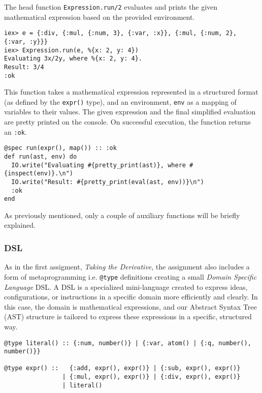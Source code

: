 \documentclass[a4paper,11pt]{article}
\begin{document}
The head function
\texttt{Expression.run/2}
evaluates and prints the given mathematical expression based on the provided environment.
\begin{verbatim}
iex> e = {:div, {:mul, {:num, 3}, {:var, :x}}, {:mul, {:num, 2}, {:var, :y}}}
iex> Expression.run(e, %{x: 2, y: 4})
Evaluating 3x/2y, where %{x: 2, y: 4}.
Result: 3/4
:ok
\end{verbatim}
This function takes a mathematical expression represented in a structured format
(as defined by the
\texttt{expr()} type),
and an environment,
\texttt{env} as a mapping of variables to their values.
The given expression and the final simplified evaluation are pretty printed on the console.
On successful execution, the function returns an
\texttt{:ok}.
\begin{verbatim}
@spec run(expr(), map()) :: :ok
def run(ast, env) do
  IO.write("Evaluating #{pretty_print(ast)}, where #{inspect(env)}.\n")
  IO.write("Result: #{pretty_print(eval(ast, env))}\n")
  :ok
end
\end{verbatim}
As previously mentioned, only a couple of auxiliary functions will be briefly explained.
\subsubsection*{DSL}
As in the first assigment, \emph{Taking the Derivative}, the assignment also includes a form of metaprogramming
i.e. \texttt{@type} definitions creating a small \emph{Domain Specific Language} DSL.
A DSL is a specialized mini-language created to express ideas, configurations, or instructions in a specific domain
more efficiently and clearly.
In this case, the domain is mathematical expressions,
and our Abstract Syntax Tree (AST) structure is tailored to express these expressions in a specific, structured way.
\begin{verbatim}
@type literal() :: {:num, number()} | {:var, atom() | {:q, number(), number()}}

@type expr() ::   {:add, expr(), expr()} | {:sub, expr(), expr()}
                | {:mul, expr(), expr()} | {:div, expr(), expr()}
                | literal()
\end{verbatim}
\end{document}
